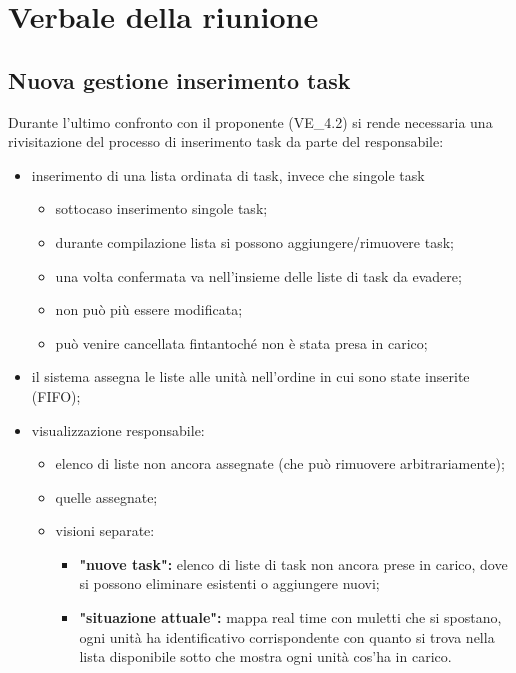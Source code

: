 \section{Verbale della riunione}

\subsection{Nuova gestione inserimento task}
\label{newtask}
Durante l'ultimo confronto con il proponente (\textsc{VE\_4.2}) si rende necessaria una rivisitazione del processo di inserimento task da parte del responsabile:
    \begin{itemize}
        \item inserimento di una lista ordinata di task, invece che singole task
        \begin{itemize}
            \item sottocaso inserimento singole task;
            \item durante compilazione lista si possono aggiungere/rimuovere task;
            \item una volta confermata va nell'insieme delle liste di task da evadere;
            \item non può più essere modificata;
            \item può venire cancellata fintantoché non è stata presa in carico;
        \end{itemize}
        \item il sistema assegna le liste alle unità nell'ordine in cui sono state inserite (FIFO);
        \item visualizzazione responsabile:
            \begin{itemize}
                \item elenco di liste non ancora assegnate (che può rimuovere arbitrariamente);

                \item quelle assegnate;

                \item visioni separate:
                \begin{itemize}
                    \item \textbf{"nuove task": }elenco di liste di task non ancora prese in carico, dove si possono eliminare esistenti  o aggiungere nuovi;
                    \item \textbf{"situazione attuale": } mappa real time con muletti che si spostano, ogni unità ha identificativo corrispondente con quanto si trova nella lista disponibile sotto che mostra ogni unità cos'ha in carico.
                \end{itemize}
            \end{itemize}
    \end{itemize}
